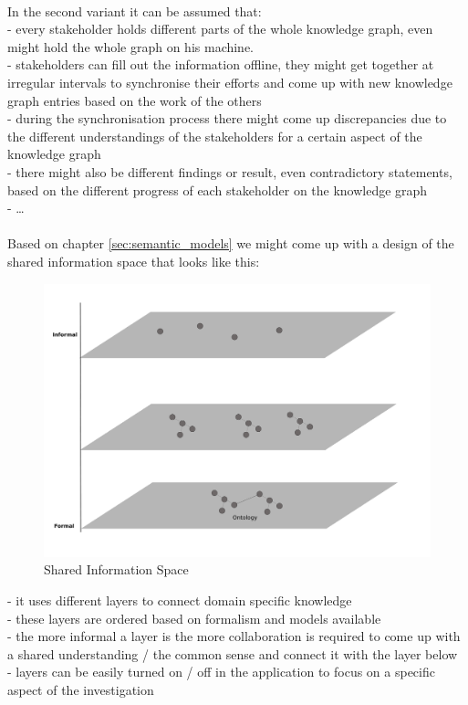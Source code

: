 \begin{appendices}
\\
In the second variant it can be assumed that: \\
- every stakeholder holds different parts of the whole knowledge graph, even might hold the whole graph on his machine. \\
- stakeholders can fill out the information offline, they might get together at irregular intervals to synchronise their efforts and
come up with new knowledge graph entries based on the work of the others \\
- during the synchronisation process there might come up discrepancies due to the different understandings of the stakeholders for a certain aspect of
the knowledge graph \\
- there might also be different findings or result, even contradictory statements, based on the different progress of each stakeholder on the knowledge graph \\
- \ldots \\
\\

Based on chapter \ref{sec:semantic_models} we might come up with a design of the shared information space that looks like this: \\

\begin{figure}[H]
	\centering
		\includegraphics[width=0.8\columnwidth]{images/sharedspace_layers.pdf}
	\caption{Shared Information Space}
\label{fig:images_sharedspace_layers}
\end{figure}

- it uses different layers to connect domain specific knowledge \\
- these layers are ordered based on formalism and models available \\
- the more informal a layer is the more collaboration is required to come up with a shared understanding / the common sense
and connect it with the layer below \\
- layers can be easily turned on / off in the application to focus on a specific aspect of the investigation \\
\\


\end{appendices}
